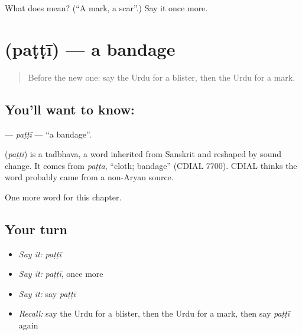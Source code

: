 \begin{tcolorbox}[breakable,colback=teal!4,colframe=teal!35!black,title={Before you move on}]
What does  mean? (\textquotedblleft{}A mark, a scar\textquotedblright{}.) Say it once more.
\end{tcolorbox}
\section[\texorpdfstring{\ur{پٹی} (paṭṭī)}{پٹی (paṭṭī)}]{ (paṭṭī) — a bandage}

\label{lesson:UR-C244-patti}



\begin{quote}
Before the new one: say the Urdu for a blister, then the Urdu for a mark.
\end{quote}

\subsection*{You'll want to know: }
\textbf{} — \emph{paṭṭī} — \textquotedblleft{}a bandage\textquotedblright{}.

\begin{cousinweb}
\textbf{} (\emph{paṭṭī}) is a tadbhava, a word inherited from Sanskrit and reshaped by sound change. It comes from \emph{paṭṭa}, \textquotedblleft{}cloth; bandage\textquotedblright{} (CDIAL 7700). CDIAL thinks the word probably came from a non-Aryan source.
\end{cousinweb}

\begin{grammarlens}[title={What you've built}]
One more word for this chapter.
\end{grammarlens}

\subsection*{Your turn}
\begin{itemize}
\raggedright
  \item \emph{Say it:} \emph{paṭṭī}
  \item \emph{Say it:} \emph{paṭṭī}, once more
  \item \emph{Say it:} say \emph{paṭṭī}
  \item \emph{Recall:} say the Urdu for a blister, then the Urdu for a mark, then say \emph{paṭṭī} again
\end{itemize}


